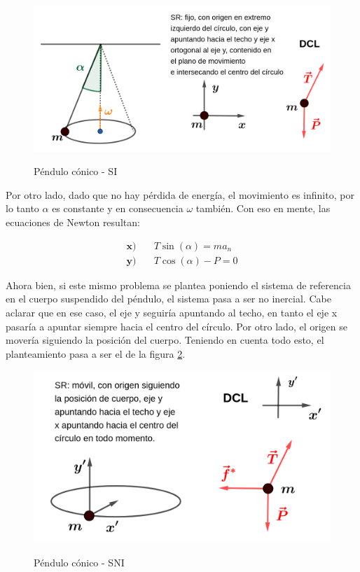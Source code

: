 \documentclass{article}
\begin{document}
\begin{figure}[ht]
\centering
\caption{Péndulo cónico - SI}
\includegraphics[scale=0.7]{../../common/img/62.01/theory/11-dynamics-conic-pendulum.png}
\label{fig:conic-pendulum}
\end{figure}

Por otro lado, dado que no hay pérdida de energía, el movimiento es infinito, por lo tanto $\alpha$ es constante y en consecuencia $\omega$ también. Con eso en mente, las ecuaciones de Newton resultan:

\begin{subequations}
\begin{align}
\textbf{x)} & \quad T \sin(\alpha) = m a_n \\
\textbf{y)} & \quad T \cos(\alpha) - P = 0
\end{align}
\end{subequations}

Ahora bien, si este mismo problema se plantea poniendo el sistema de referencia en el cuerpo suspendido del péndulo, el sistema pasa a ser no inercial. Cabe aclarar que en ese caso, el eje y seguiría apuntando al techo, en tanto el eje x pasaría a apuntar siempre hacia el centro del círculo. Por otro lado, el origen se movería siguiendo la posición del cuerpo. Teniendo en cuenta todo esto, el planteamiento pasa a ser el de la figura \ref{fig:conic-pendulum-ni}.

\begin{figure}[ht]
\centering
\caption{Péndulo cónico - SNI}
\includegraphics[scale=0.7]{../../common/img/62.01/theory/12-dynamics-conic-pendulum-ni.png}
\label{fig:conic-pendulum-ni}
\end{figure}
\end{document}
